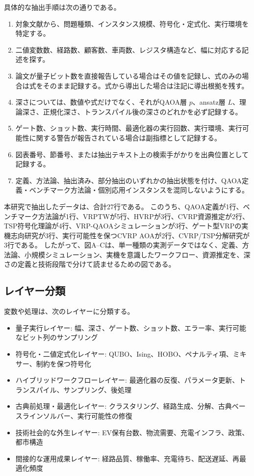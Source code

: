 具体的な抽出手順は次の通りである。

\begin{enumerate}
  \item 対象文献から、問題種類、インスタンス規模、符号化・定式化、実行環境を特定する。
  \item 二値変数数、経路数、顧客数、車両数、レジスタ構造など、幅に対応する記述を探す。
  \item 論文が量子ビット数を直接報告している場合はその値を記録し、式のみの場合は式をそのまま記録する。式から導出した場合は注記に導出根拠を残す。
  \item 深さについては、数値や式だけでなく、それがQAOA層 $p$、ansatz層 $L$、理論深さ、正規化深さ、トランスパイル後の深さのどれかを必ず記録する。
  \item ゲート数、ショット数、実行時間、最適化器の実行回数、実行環境、実行可能性に関する警告が報告されている場合は副指標として記録する。
  \item 図表番号、節番号、または抽出テキスト上の検索手がかりを出典位置として記録する。
  \item 定義、方法論、抽出済み、部分抽出のいずれかの抽出状態を付け、QAOA定義・ベンチマーク方法論・個別応用インスタンスを混同しないようにする。
\end{enumerate}

本研究で抽出したデータは、合計27行である。
このうち、QAOA定義が1行、ベンチマーク方法論が1行、VRPTWが5行、HVRPが3行、CVRP資源推定が2行、TSP符号化理論が4行、VRP-QAOAシミュレーションが3行、ゲート型VRPの実機志向研究が3行、実行可能性を保つCVRP AOAが2行、CVRP/TSP分解研究が3行である。
したがって、図A--Cは、単一種類の実測データではなく、定義、方法論、小規模シミュレーション、実機を意識したワークフロー、資源推定を、深さの定義と技術段階で分けて読ませるための図である。

\subsection{レイヤー分類}

変数や処理は、次のレイヤーに分類する。

\begin{itemize}
  \item 量子実行レイヤー: 幅、深さ、ゲート数、ショット数、エラー率、実行可能なビット列のサンプリング
  \item 符号化・二値定式化レイヤー: QUBO、Ising、HOBO、ペナルティ項、ミキサー、制約を保つ符号化
  \item ハイブリッドワークフローレイヤー: 最適化器の反復、パラメータ更新、トランスパイル、サンプリング、後処理
  \item 古典前処理・最適化レイヤー: クラスタリング、経路生成、分解、古典ベースラインソルバー、実行可能性の修復
  \item 技術社会的な外生レイヤー: EV保有台数、物流需要、充電インフラ、政策、都市構造
  \item 間接的な運用成果レイヤー: 経路品質、稼働率、充電待ち、配送遅延、再最適化頻度
\end{itemize}

